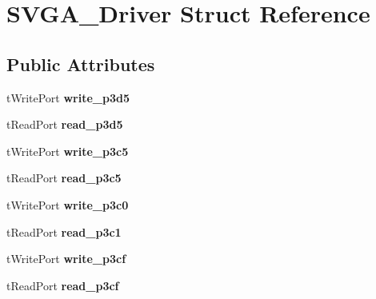 \hypertarget{structSVGA__Driver}{\section{S\-V\-G\-A\-\_\-\-Driver Struct Reference}
\label{structSVGA__Driver}
}
\subsection*{Public Attributes}
\begin{DoxyCompactItemize}
\item 
\hypertarget{structSVGA__Driver_ae9e3017aac31365bf3b16c950ac359c5}{t\-Write\-Port {\bfseries write\-\_\-p3d5}}\label{structSVGA__Driver_ae9e3017aac31365bf3b16c950ac359c5}

\item 
\hypertarget{structSVGA__Driver_ad0407b76b762af8da760d50f6ee3f4ae}{t\-Read\-Port {\bfseries read\-\_\-p3d5}}\label{structSVGA__Driver_ad0407b76b762af8da760d50f6ee3f4ae}

\item 
\hypertarget{structSVGA__Driver_a11d878ccb121c146a3a7e9839f65ca3c}{t\-Write\-Port {\bfseries write\-\_\-p3c5}}\label{structSVGA__Driver_a11d878ccb121c146a3a7e9839f65ca3c}

\item 
\hypertarget{structSVGA__Driver_a09e94a61efd317a259bcfab28d60964d}{t\-Read\-Port {\bfseries read\-\_\-p3c5}}\label{structSVGA__Driver_a09e94a61efd317a259bcfab28d60964d}

\item 
\hypertarget{structSVGA__Driver_a59cb991bae1b548974fa503511ec14cd}{t\-Write\-Port {\bfseries write\-\_\-p3c0}}\label{structSVGA__Driver_a59cb991bae1b548974fa503511ec14cd}

\item 
\hypertarget{structSVGA__Driver_abd54c023121ffd89958496deea626b3e}{t\-Read\-Port {\bfseries read\-\_\-p3c1}}\label{structSVGA__Driver_abd54c023121ffd89958496deea626b3e}

\item 
\hypertarget{structSVGA__Driver_ab25318630d9193fb863c79db9db9b3f3}{t\-Write\-Port {\bfseries write\-\_\-p3cf}}\label{structSVGA__Driver_ab25318630d9193fb863c79db9db9b3f3}

\item 
\hypertarget{structSVGA__Driver_a0b9b1a8bad1962cce68f8f6365ab5ead}{t\-Read\-Port {\bfseries read\-\_\-p3cf}}\label{structSVGA__Driver_a0b9b1a8bad1962cce68f8f6365ab5ead}


\end{DoxyCompactItemize}
